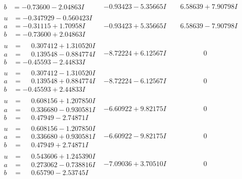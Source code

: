 \documentclass[1p]{elsarticle_modified}
\theoremstyle{definition}
\begin{document}
$$\begin{array}{c|c|c}
\begin{aligned}
b &= -0.73600 - 2.04863 I\end{aligned}
 & -0.93423 - 5.35665 I & \phantom{-}6.58639 + 7.90798 I \\ \hline\begin{aligned}
u &= -0.347929 - 0.560423 I \\
a &= -0.31115 + 1.70958 I \\
b &= -0.73600 + 2.04863 I\end{aligned}
 & -0.93423 + 5.35665 I & \phantom{-}6.58639 - 7.90798 I \\ \hline\begin{aligned}
u &= \phantom{-}0.307412 + 1.310520 I \\
a &= \phantom{-}0.139548 - 0.884774 I \\
b &= -0.45593 - 2.44833 I\end{aligned}
 & -8.72224 + 6.12567 I & \phantom{-0.000000 } 0 \\ \hline\begin{aligned}
u &= \phantom{-}0.307412 - 1.310520 I \\
a &= \phantom{-}0.139548 + 0.884774 I \\
b &= -0.45593 + 2.44833 I\end{aligned}
 & -8.72224 - 6.12567 I & \phantom{-0.000000 } 0 \\ \hline\begin{aligned}
u &= \phantom{-}0.608156 + 1.207850 I \\
a &= \phantom{-}0.336680 - 0.930581 I \\
b &= \phantom{-}0.47949 - 2.74871 I\end{aligned}
 & -6.60922 + 9.82175 I & \phantom{-0.000000 } 0 \\ \hline\begin{aligned}
u &= \phantom{-}0.608156 - 1.207850 I \\
a &= \phantom{-}0.336680 + 0.930581 I \\
b &= \phantom{-}0.47949 + 2.74871 I\end{aligned}
 & -6.60922 - 9.82175 I & \phantom{-0.000000 } 0 \\ \hline\begin{aligned}
u &= \phantom{-}0.543606 + 1.245390 I \\
a &= \phantom{-}0.273062 - 0.738816 I \\
b &= \phantom{-}0.65790 - 2.53745 I\end{aligned}
 & -7.09036 + 3.70510 I & \phantom{-0.000000 } 0 \\ \hline\begin{aligned}

\end{aligned}
\end{array}$$
\end{document}

